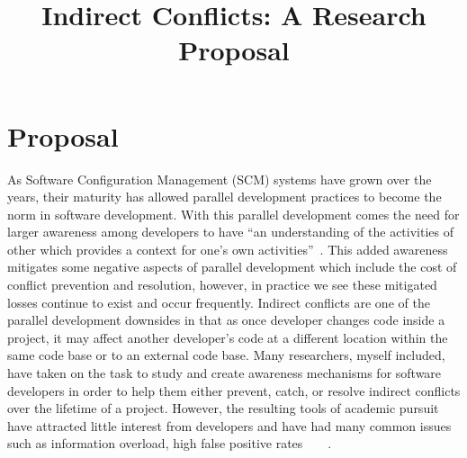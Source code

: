 \documentclass[conference]{IEEEtran}
\begin{document}
\title{Indirect Conflicts: A Research Proposal}

\author{
}

\maketitle


\section{Proposal}
As Software Configuration Management (SCM) systems have grown over the years, their maturity has allowed parallel development
practices to become the norm in software development. With this parallel development comes the need for larger awareness among developers
to have ``an understanding of the activities of other which provides a context for one's own activities''~\cite{Dourish:1992:ACS}. This
added awareness mitigates some negative aspects of parallel development which include the cost of conflict prevention and resolution,
however, in practice we see these mitigated losses continue to exist and occur frequently. Indirect conflicts are one of the parallel 
development downsides in that as once developer changes code inside a project, it may affect another developer's code at a different
location within the same code base or to an external code base. Many researchers, myself included, have taken on the task to study and
create awareness mechanisms for software developers in order to help them either prevent, catch, or resolve indirect conflicts over the
lifetime of a project. However, the resulting tools of academic pursuit have attracted little interest from developers and have had
many common issues such as information overload, high false 
positive rates~\cite{Sarma:2007:TSA}~\cite{Biehl:2007:FVD}~\cite{Sarma:2009:TIV}~\cite{Servant:2010:CPI}.
\end{document}
